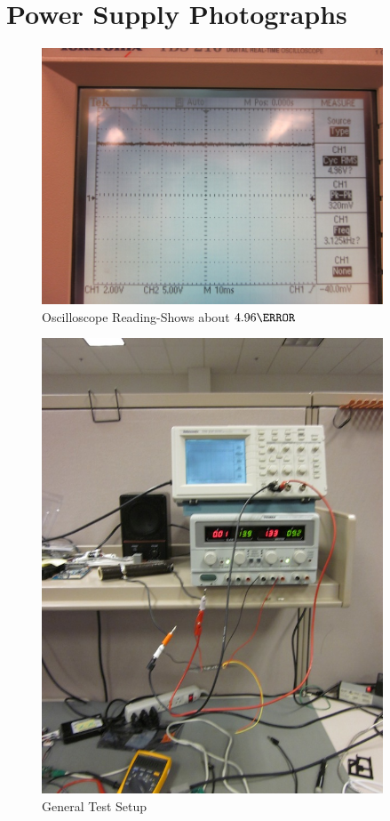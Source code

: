 \section{Power Supply Photographs}
\begin{figure}[htbp]
\begin{center}
\includegraphics[width=4in]{includes/IMG_0181}
\caption{Oscilloscope Reading-Shows about $4.96\volt$}
\end{center}
\end{figure}

\begin{figure}[htbp]
\begin{center}
\includegraphics[width=4in]{includes/IMG_0182}
\caption{General Test Setup}
\end{center}
\end{figure}

